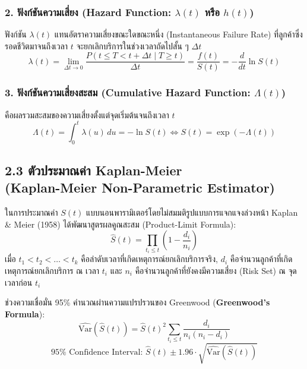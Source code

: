 \documentclass[12pt,a4paper]{article}
\begin{document}
\subsubsection*{2. ฟังก์ชันความเสี่ยง (Hazard Function: $\lambda(t)$ หรือ $h(t)$)}
ฟังก์ชัน $\lambda(t)$ แทนอัตราความเสี่ยงขณะใดขณะหนึ่ง (Instantaneous Failure Rate) ที่ลูกค้าซึ่งรอดชีวิตมาจนถึงเวลา $t$ จะยกเลิกบริการในช่วงเวลาถัดไปสั้น ๆ $\Delta t$
\begin{equation}
    \lambda(t) = \lim_{\Delta t \to 0} \frac{P(t \le T < t + \Delta t \mid T \ge t)}{\Delta t} = \frac{f(t)}{S(t)} = -\frac{d}{dt} \ln S(t)
\end{equation}

\subsubsection*{3. ฟังก์ชันความเสี่ยงสะสม (Cumulative Hazard Function: $\Lambda(t)$)}
คือผลรวมสะสมของความเสี่ยงตั้งแต่จุดเริ่มต้นจนถึงเวลา $t$
\begin{equation}
    \Lambda(t) = \int_0^t \lambda(u)\,du = -\ln S(t) \iff S(t) = \exp\left(-\Lambda(t)\right)
\end{equation}

\subsection*{2.3 ตัวประมาณค่า Kaplan-Meier\\ \normalsize(Kaplan-Meier Non-Parametric Estimator)}
ในการประมาณค่า $S(t)$ แบบนอนพารามิเตอร์โดยไม่สมมติรูปแบบการแจกแจงล่วงหน้า Kaplan \& Meier (1958) ได้พัฒนาสูตรผลคูณสะสม (Product-Limit Formula):
\begin{equation}
    \hat{S}(t) = \prod_{t_i \le t} \left(1 - \frac{d_i}{n_i}\right)
\end{equation}
เมื่อ $t_1 < t_2 < \dots < t_k$ คือลำดับเวลาที่เกิดเหตุการณ์ยกเลิกบริการจริง, $d_i$ คือจำนวนลูกค้าที่เกิดเหตุการณ์ยกเลิกบริการ ณ เวลา $t_i$ และ $n_i$ คือจำนวนลูกค้าที่ยังคงมีความเสี่ยง (Risk Set) ณ จุดเวลาก่อน $t_i$

ช่วงความเชื่อมั่น 95\% คำนวณผ่านความแปรปรวนของ Greenwood (\textbf{Greenwood's Formula}):
\begin{equation}
    \widehat{\text{Var}}(\hat{S}(t)) = \hat{S}(t)^2 \sum_{t_i \le t} \frac{d_i}{n_i(n_i - d_i)}
\end{equation}
\begin{equation}
    95\% \text{ Confidence Interval: } \hat{S}(t) \pm 1.96 \cdot \sqrt{\widehat{\text{Var}}(\hat{S}(t))}
\end{equation}
\end{document}
